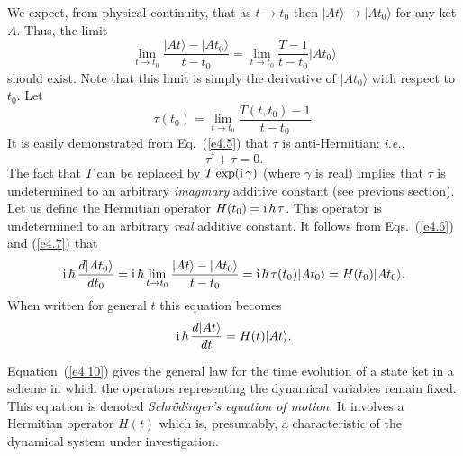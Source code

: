 We expect, from physical continuity, that as $t\rightarrow t_0$ then
$|At\rangle\rightarrow |A t_0\rangle$ for any ket $A$. Thus, the
limit
\begin{equation}\label{e4.6}
\lim_{t\rightarrow t_0} \frac{|At\rangle - |At_0\rangle}{t-t_0} =
\lim_{t\rightarrow t_0}\frac{T-1}{t-t_0}|At_0\rangle
\end{equation}
should exist. Note that this limit is simply the derivative of
$|A t_0\rangle$ with respect to $t_0$. Let 
\begin{equation}\label{e4.7}
\tau(t_0) = \lim_{t\rightarrow t_0}\frac{T(t, t_0)-1}{t-t_0}.
\end{equation}
It is easily demonstrated from Eq.~(\ref{e4.5}) that $\tau$ is anti-Hermitian:
{\em i.e.},
\begin{equation}
\tau^{\dag} + \tau = 0.
\end{equation}
The fact that $T$ can be replaced by $T\exp({\rm i}\,\gamma)$ (where $\gamma$ is
real) implies that $\tau$ is undetermined to an arbitrary {\em imaginary} additive
constant (see previous section). Let us
define the Hermitian operator $H(t_0)= {\rm i}\,\hbar \,\tau$. This operator is
undetermined to an arbitrary {\em  real} additive constant. It follows from Eqs.~(\ref{e4.6})
and (\ref{e4.7}) that
\begin{equation}
{\rm i}\,\hbar \,\frac{d|At_0\rangle}{dt_0} = {\rm i}\,\hbar\lim_{t\rightarrow t_0}
\frac{ |At\rangle - |At_0\rangle}{t-t_0} = {\rm i}\,\hbar\,\tau(t_0)|At_0\rangle
= H(t_0) |At_0\rangle.
\end{equation}
When written for general $t$ this equation becomes
\begin{equation}\label{e4.10}
{\rm i}\,\hbar\, \frac{d|At\rangle}{dt} = H(t)|At\rangle.
\end{equation}

Equation~(\ref{e4.10}) gives the general law for the time evolution  of a state
ket in a scheme in which the operators representing the dynamical variables remain
fixed. This equation is denoted {\em Schr\"{o}dinger's equation of motion}. 
It involves a Hermitian operator $H(t)$ which is, presumably, a characteristic
of the dynamical system under investigation. 

